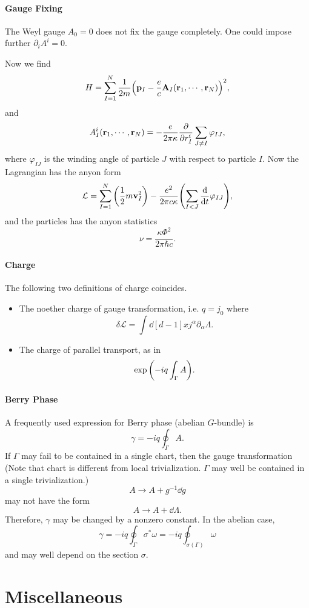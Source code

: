\documentclass{article}
\begin{document}
\paragraph*{Gauge Fixing}%
The Weyl gauge $A_0 = 0$ does not fix the gauge completely.
One could impose further $\partial_i A^i = 0$.
\par
Now we find
\[ H = \sum_{I=1}^N \frac{1}{2m}\qty(\vb{p}_I - \frac{e}{c}\vb{A}_I(\vb{r}_1,\cdots,\vb{r}_N))^2, \]
and
\[ A^i_I(\vb{r}_1,\cdots,\vb{r}_N) = -\frac{e}{2\pi \kappa} \pdv{}{r^i_I} \sum_{J\neq I} \varphi_{IJ}, \]
where $\varphi_{IJ}$ is the winding angle of particle $J$ with respect to particle $I$.
Now the Lagrangian has the anyon form
\[ \mathcal{L} = \sum_{I=1}^N \qty(\frac{1}{2}m\vb{v}_I^2) - \frac{e^2}{2\pi c\kappa}\qty(\sum_{I<J} \dv{}{t}\varphi_{IJ}), \]
and the particles has the anyon statistics
\[ \nu = \frac{\kappa \Phi^2}{2\pi\hbar c}. \]

\paragraph*{Charge}
The following two definitions of charge coincides.
\begin{itemize}
    \item The noether charge of gauge transformation, i.e. $q = j_0$ where
    \[ \delta\mathcal{L} = \int \dd[d-1]{x} j^\alpha \partial_\alpha \Lambda. \]
    \item The charge of parallel transport, as in
    \[ \exp\qty(-iq \int_\Gamma A). \]
\end{itemize}

\paragraph*{Berry Phase}
A frequently used expression for Berry phase (abelian $G$-bundle) is
\[ \gamma = -iq \oint_\Gamma A. \]
If $\Gamma$ may fail to be contained in a single chart, then the gauge transformation
(Note that chart is different from local trivialization.
$\Gamma$ may well be contained in a single trivialization.)
\[ A \rightarrow A + g^{-1} \dd{g} \]
may not have the form
\[ A \rightarrow A + \dd{\Lambda}. \]
Therefore, $\gamma$ may be changed by a nonzero constant.
In the abelian case,
\[ \gamma = -iq \oint_\Gamma \sigma^* \omega = -iq \oint_{\sigma(\Gamma)} \omega \]
and may well depend on the section $\sigma$.

\section{Miscellaneous}
\end{document}
